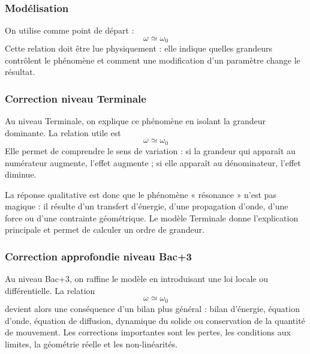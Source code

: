 \documentclass[11pt,a4paper]{article}
\begin{document}
\subsubsection*{Modélisation}

\begin{theorembox}
On utilise comme point de départ :
\[
\omega\simeq\omega_0
\]
Cette relation doit être lue physiquement : elle indique quelles grandeurs contrôlent le phénomène et comment une modification d'un paramètre change le résultat.
\end{theorembox}

\subsubsection*{Correction niveau Terminale}

\begin{corrigebox}

Au niveau Terminale, on explique ce phénomène en isolant la grandeur dominante. La relation utile est
\[
\omega\simeq\omega_0
\]
Elle permet de comprendre le sens de variation : si la grandeur qui apparaît au numérateur augmente, l'effet augmente ; si elle apparaît au dénominateur, l'effet diminue.

La réponse qualitative est donc que le phénomène « résonance » n'est pas magique : il résulte d'un transfert d'énergie, d'une propagation d'onde, d'une force ou d'une contrainte géométrique. Le modèle Terminale donne l'explication principale et permet de calculer un ordre de grandeur.

\end{corrigebox}

\subsubsection*{Correction approfondie niveau Bac+3}

\begin{approfondissementbox}

Au niveau Bac+3, on raffine le modèle en introduisant une loi locale ou différentielle. La relation
\[
\omega\simeq\omega_0
\]
devient alors une conséquence d'un bilan plus général : bilan d'énergie, équation d'onde, équation de diffusion, dynamique du solide ou conservation de la quantité de mouvement. Les corrections importantes sont les pertes, les conditions aux limites, la géométrie réelle et les non-linéarités.

\end{approfondissementbox}
\end{document}
